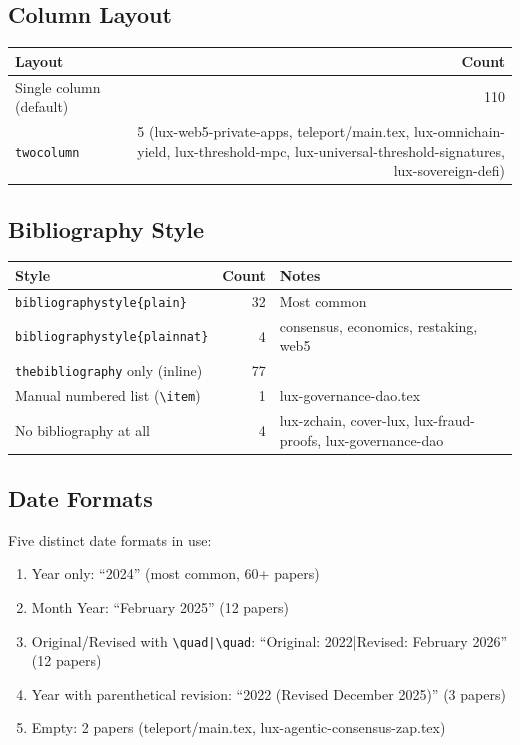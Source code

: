 \documentclass[11pt,a4paper]{article}
\begin{document}
\subsection{Column Layout}

\begin{tabular}{lr}
\toprule
\textbf{Layout} & \textbf{Count} \\
\midrule
Single column (default) & 110 \\
\texttt{twocolumn} & 5 (lux-web5-private-apps, teleport/main.tex, lux-omnichain-yield, lux-threshold-mpc, lux-universal-threshold-signatures, lux-sovereign-defi) \\
\bottomrule
\end{tabular}

\subsection{Bibliography Style}

\begin{tabular}{lrp{6cm}}
\toprule
\textbf{Style} & \textbf{Count} & \textbf{Notes} \\
\midrule
\texttt{bibliographystyle\{plain\}} & 32 & Most common \\
\texttt{bibliographystyle\{plainnat\}} & 4 & consensus, economics, restaking, web5 \\
\texttt{thebibliography} only (inline) & 77 & \\
Manual numbered list (\texttt{\textbackslash item}) & 1 & lux-governance-dao.tex \\
No bibliography at all & 4 & lux-zchain, cover-lux, lux-fraud-proofs, lux-governance-dao \\
\bottomrule
\end{tabular}

\subsection{Date Formats}

Five distinct date formats in use:
\begin{enumerate}[leftmargin=2em]
\item Year only: ``2024'' (most common, 60+ papers)
\item Month Year: ``February 2025'' (12 papers)
\item Original/Revised with \texttt{\textbackslash quad|\textbackslash quad}: ``Original: 2022\quad|\quad Revised: February 2026'' (12 papers)
\item Year with parenthetical revision: ``2022 (Revised December 2025)'' (3 papers)
\item Empty: 2 papers (teleport/main.tex, lux-agentic-consensus-zap.tex)
\end{enumerate}
\end{document}
